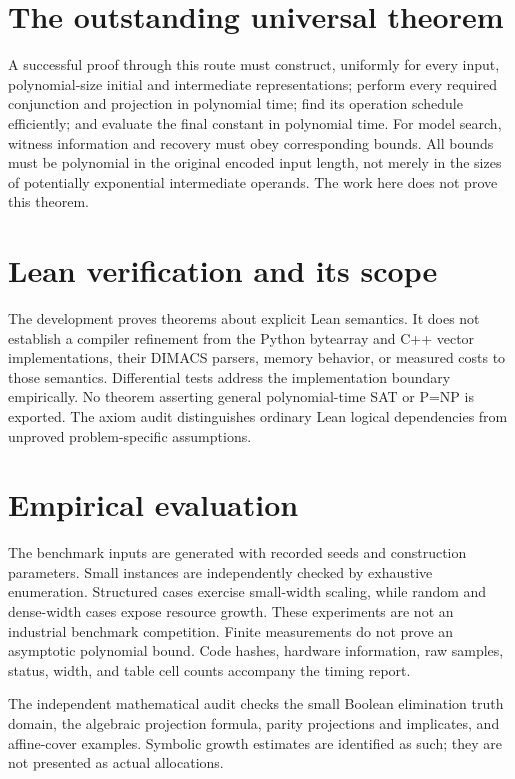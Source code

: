 \documentclass[11pt]{article}
\begin{document}
\section{The outstanding universal theorem}
A successful proof through this route must construct, uniformly for
every input, polynomial-size initial and intermediate representations;
perform every required conjunction and projection in polynomial time;
find its operation schedule efficiently; and evaluate the final constant
in polynomial time. For model search, witness information and recovery
must obey corresponding bounds.
All bounds must be polynomial in the original encoded input length,
not merely in the sizes of potentially exponential intermediate operands.
The work here does not prove this theorem.

\section{Lean verification and its scope}
The development proves theorems about explicit Lean semantics.
It does not establish a compiler refinement from the Python bytearray
and C++ vector implementations, their DIMACS parsers, memory behavior,
or measured costs to those semantics. Differential tests address the
implementation boundary empirically. No theorem asserting general
polynomial-time SAT or P=NP is exported.
The axiom audit distinguishes ordinary Lean logical dependencies from
unproved problem-specific assumptions.

\section{Empirical evaluation}
The benchmark inputs are generated with recorded seeds and construction
parameters. Small instances are independently checked by exhaustive
enumeration. Structured cases exercise small-width scaling, while random
and dense-width cases expose resource growth.
These experiments are not an industrial benchmark competition.
Finite measurements do not prove an asymptotic polynomial bound.
Code hashes, hardware information, raw samples, status, width, and table
cell counts accompany the timing report.

The independent mathematical audit checks the small Boolean elimination
truth domain, the algebraic projection formula, parity projections and
implicates, and affine-cover examples. Symbolic growth estimates are
identified as such; they are not presented as actual allocations.
\end{document}
